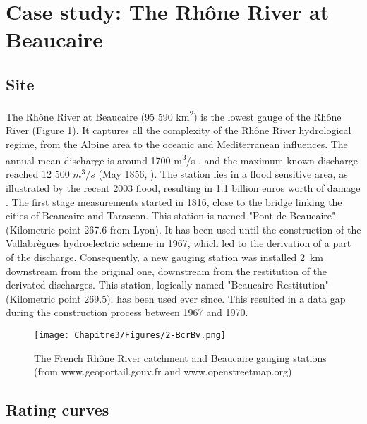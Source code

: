 \section{Case study: The Rhône River at Beaucaire}
\label{sec:Bcr}
    \subsection{Site}
    
    The Rhône River at Beaucaire (95 590 km\textsuperscript{2}) is the lowest gauge of the Rhône River (Figure \ref{fig:locstations}). It captures all the complexity of the Rhône River hydrological regime, from the Alpine area to the oceanic and Mediterranean influences. The annual mean discharge is around 1700 m\textsuperscript{3}/s \citep{bard_actualisation_2018}, and the maximum known discharge reached 12 500 $m^3/s$ (May 1856, \citet{lang_les_2014}). The station lies in a flood sensitive area, as illustrated by the recent 2003 flood, resulting in 1.1 billion euros worth of damage \citep{lang_les_2014}. 
    The first stage measurements started in 1816, close to the bridge linking the cities of Beaucaire and Tarascon. This station is named "Pont de Beaucaire" (Kilometric point 267.6 from Lyon). It has been used until the construction of the Vallabrègues hydroelectric scheme in 1967, which led to the derivation of a part of the discharge. Consequently, a new gauging station was installed 2~km downstream from the original one, downstream from the restitution of the derivated discharges. This station, logically named "Beaucaire Restitution" (Kilometric point 269.5), has been used ever since. This resulted in a data gap during the construction process between 1967 and 1970.

    \begin{figure}[h!]
        \centering
        \texttt{[image: Chapitre3/Figures/2-BcrBv.png]}
        \caption{The French Rhône River catchment and Beaucaire gauging stations (from www.geoportail.gouv.fr and www.openstreetmap.org)}
        \label{fig:locstations}
    \end{figure}
 
    \subsection{Rating curves}
    \label{sec:prior_elicitation}
       
